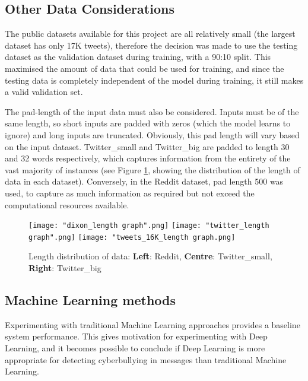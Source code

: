 \documentclass[12pt,a4paper]{article}
\begin{document}
\subsection{Other Data Considerations}
The public datasets available for this project are all relatively small (the largest dataset has only 17K tweets), therefore the decision was made to use the testing dataset as the validation dataset during training, with a 90:10 split. This maximised the amount of data that could be used for training, and since the testing data is completely independent of the model during training, it still makes a valid validation set. 

The pad-length of the input data must also be considered. Inputs must be of the same length, so short inputs are padded with zeros (which the model learns to ignore) and long inputs are truncated. Obviously, this pad length will vary based on the input dataset. Twitter\_small and Twitter\_big are padded to length 30 and 32 words respectively, which captures information from the entirety of the vast majority of instances (see Figure \ref{len:len3}, showing the distribution of the length of data in each dataset). Conversely, in the Reddit dataset, pad length 500 was used, to capture as much information as required but not exceed the computational resources available.

\begin{figure}[H]
	\centering
	\hspace*{-0.10\textwidth}
	\texttt{[image: "dixon\_length graph".png]} \hfill
	\texttt{[image: "twitter\_length graph".png]}\hfill
	\texttt{[image: "tweets\_16K\_length graph.png]} \hfill
	\hspace*{-0.10\textwidth}
	
	\caption{Length distribution of data: \textbf{Left}: Reddit, \textbf{Centre}: Twitter\_small, \textbf{Right}: Twitter\_big}
	\label{len:len3}
\end{figure}


\subsection{Machine Learning methods}
Experimenting with traditional Machine Learning approaches provides a baseline system performance. This gives motivation for experimenting with Deep Learning, and it becomes possible to conclude if Deep Learning is more appropriate for detecting cyberbullying in messages than traditional Machine Learning.
\end{document}
